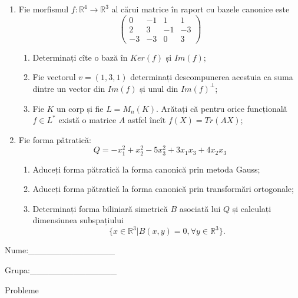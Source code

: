 \documentclass{article}
\begin{document}
\begin{enumerate}
 \item Fie morfismul $f:\mathbb{R}^4 \to \mathbb{R}^3$ al cărui matrice în raport cu bazele canonice este
$$\begin{pmatrix}
0&-1&1&1\\
2&3&-1&-3\\
-3&-3&0&3
\end{pmatrix}$$

\begin{enumerate}
\item Determinați cîte o bază în $Ker(f)$ și $Im(f)$;
\item Fie vectorul $v=(1,3,1)$ determinați descompunerea acestuia ca suma dintre un vector din $Im(f)$ și unul din $Im(f)^\perp$;
\item Fie $K$ un corp și fie $L=M_n(K)$. Arătați că pentru orice funcțională $f \in L^*$ există o matrice $A$ astfel încît $f(X)=Tr(AX)$;
\end{enumerate}
\item Fie forma pătratică:
$$Q= -x_1^2+x_2^2-5x_3^2+3x_1x_3+4x_2x_3$$

\begin{enumerate}
\item Aduceți forma pătratică la forma canonică prin metoda Gauss;
\item Aduceți forma pătratică la forma canonică prin transformări ortogonale;
\item Determinați forma biliniară simetrică $B$ asociată lui $Q$ și calculați dimensiunea subspațiului
$$\{x \in \mathbb{R}^3 | B(x,y)=0,\forall y \in \mathbb{R}^3\}.$$

\end{enumerate}
\end{enumerate}
\newpage
\begin{flushright}
Nume:\_\_\_\_\_\_\_\_\_\_\_\_\_\_
 
 
Grupa:\_\_\_\_\_\_\_\_\_\_\_\_\_\_
\end{flushright}
\begin{center}
\vspace{2cm}
{\Large Probleme}
\vspace{2cm}
\end{center}
\end{document}
